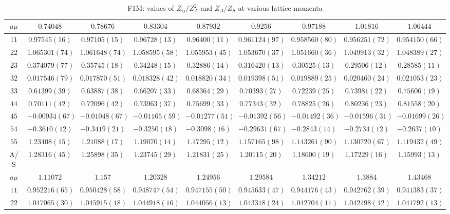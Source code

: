 \begin{sidewaystable}
\begin{center}
\caption{F1M: values of $Z_{ij}/Z_A^2$ and $Z_A/Z_S$ at various lattice momenta}
\begin{tabular}{c|c c c c c c c c}
\hline
\hline
$a\mu$ & $0.74048$ & $0.78676$ & $0.83304$ & $0.87932$ & $0.9256$ & $0.97188$ & $1.01816$ & $1.06444$ \\
\hline
$11$ & $0.97545(16)$ & $0.97105(15)$ & $0.96728(13)$ & $0.96400(11)$ & $0.961124(97)$ & $0.958560(80)$ & $0.956251(72)$ & $0.954150(66)$ \\
$22$ & $1.065301(74)$ & $1.061648(74)$ & $1.058595(58)$ & $1.055953(45)$ & $1.053670(37)$ & $1.051660(36)$ & $1.049913(32)$ & $1.048389(27)$ \\
$23$ & $0.374079(77)$ & $0.35745(18)$ & $0.34248(15)$ & $0.32886(14)$ & $0.316420(13)$ & $0.30525(13)$ & $0.29506(12)$ & $0.28585(11)$ \\
$32$ & $0.017546(79)$ & $0.017870(51)$ & $0.018328(42)$ & $0.018820(34)$ & $0.019398(51)$ & $0.019889(25)$ & $0.020460(24)$ & $0.021053(23)$ \\
$33$ & $0.61399(39)$ & $0.63887(38)$ & $0.66207(33)$ & $0.68364(29)$ & $0.70393(27)$ & $0.72239(25)$ & $0.73981(22)$ & $0.75606(19)$ \\
$44$ & $0.70111(42)$ & $0.72096(42)$ & $0.73963(37)$ & $0.75699(33)$ & $0.77343(32)$ & $0.78825(26)$ & $0.80236(23)$ & $0.81558(20)$ \\
$45$ & $-0.00934(67)$ & $-0.01048(67)$ & $-0.01165(59)$ & $-0.01277(51)$ & $-0.01392(56)$ & $-0.01492(36)$ & $-0.01596(31)$ & $-0.01699(26)$ \\
$54$ & $-0.3610(12)$ & $-0.3419(21)$ & $-0.3250(18)$ & $-0.3098(16)$ & $-0.29631(67)$ & $-0.2843(14)$ & $-0.2734(12)$ & $-0.2637(10)$ \\
$55$ & $1.23408(15)$ & $1.21088(17)$ & $1.19070(14)$ & $1.17295(12)$ & $1.157165(98)$ & $1.143261(90)$ & $1.130720(67)$ & $1.119432(49)$ \\
\hline
A/S & $1.28316(45)$ & $1.25898(35)$ & $1.23745(29)$ & $1.21831(25)$ & $1.20115(20)$ & $1.18600(19)$ & $1.17229(16)$ & $1.15993(13)$ \\
\hline
$a\mu$ & $1.11072$ & $1.157$ & $1.20328$ & $1.24956$ & $1.29584$ & $1.34212$ & $1.3884$ & $1.43468$ \\
\hline
$11$ & $0.952216(65)$ & $0.950428(58)$ & $0.948747(54)$ & $0.947155(50)$ & $0.945633(47)$ & $0.944176(43)$ & $0.942762(39)$ & $0.941383(37)$ \\
$22$ & $1.047065(30)$ & $1.045915(18)$ & $1.044918(16)$ & $1.044056(13)$ & $1.043318(24)$ & $1.042704(11)$ & $1.042198(12)$ & $1.041792(13)$ \\

\end{tabular}
\end{center}
\end{sidewaystable}

